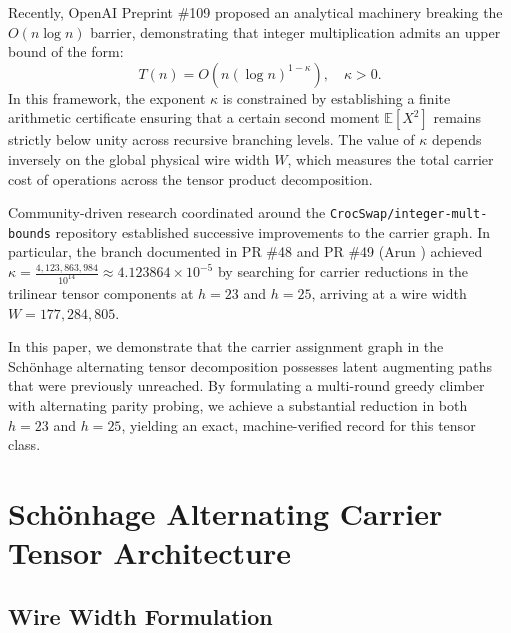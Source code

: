 \documentclass[11pt,a4paper]{article}
\begin{document}
Recently, OpenAI Preprint \#109 proposed an analytical machinery breaking the $O(n \log n)$ barrier, demonstrating that integer multiplication admits an upper bound of the form:
\begin{equation}
T(n) = O\left(n (\log n)^{1 - \kappa}\right), \quad \kappa > 0.
\end{equation}
In this framework, the exponent $\kappa$ is constrained by establishing a finite arithmetic certificate ensuring that a certain second moment $\mathbb{E}[X^2]$ remains strictly below unity across recursive branching levels. The value of $\kappa$ depends inversely on the global physical wire width $W$, which measures the total carrier cost of operations across the tensor product decomposition.

Community-driven research coordinated around the \texttt{CrocSwap/integer-mult-bounds} repository \cite{colkitt2026} established successive improvements to the carrier graph. In particular, the branch documented in PR \#48 and PR \#49 (Arun \cite{arun2026}) achieved $\kappa = \frac{4,123,863,984}{10^{14}} \approx 4.123864 \times 10^{-5}$ by searching for carrier reductions in the trilinear tensor components at $h=23$ and $h=25$, arriving at a wire width $W = 177,284,805$.

In this paper, we demonstrate that the carrier assignment graph in the Sch\"{o}nhage alternating tensor decomposition possesses latent augmenting paths that were previously unreached. By formulating a multi-round greedy climber with alternating parity probing, we achieve a substantial reduction in both $h=23$ and $h=25$, yielding an exact, machine-verified record for this tensor class.

\section{Sch\"{o}nhage Alternating Carrier Tensor Architecture}

\subsection{Wire Width Formulation}
\end{document}
